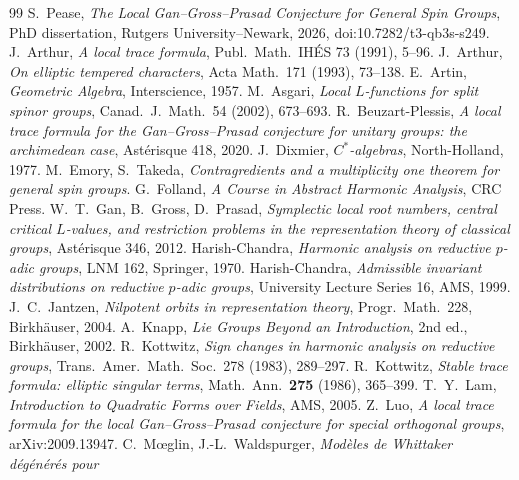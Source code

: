









\begin{thebibliography}{99}
 S.~Pease, \emph{The Local Gan--Gross--Prasad Conjecture for General Spin Groups},
  PhD dissertation, Rutgers University--Newark, 2026, doi:10.7282/t3-qb3s-s249.
 J.~Arthur, \emph{A local trace formula}, Publ.\ Math.\ IH\'ES 73 (1991), 5--96.
 J.~Arthur, \emph{On elliptic tempered characters}, Acta Math.\ 171 (1993), 73--138.
 E.~Artin, \emph{Geometric Algebra}, Interscience, 1957.
 M.~Asgari, \emph{Local $L$-functions for split spinor groups}, Canad.\ J.\ Math.\ 54 (2002),
673--693.
 R.~Beuzart-Plessis, \emph{A local trace formula for the Gan--Gross--Prasad conjecture for
  unitary groups: the archimedean case}, Ast\'erisque 418, 2020.
 J.~Dixmier, \emph{$C^*$-algebras}, North-Holland, 1977.
 M.~Emory, S.~Takeda, \emph{Contragredients and a multiplicity one theorem for general
  spin groups}.
 G.~Folland, \emph{A Course in Abstract Harmonic Analysis}, CRC Press.
 W.~T.~Gan, B.~Gross, D.~Prasad, \emph{Symplectic local root numbers, central critical
  $L$-values, and restriction problems in the representation theory of classical groups},
  Ast\'erisque 346, 2012.
 Harish-Chandra, \emph{Harmonic analysis on reductive $p$-adic groups}, LNM 162,
  Springer, 1970.
 Harish-Chandra, \emph{Admissible invariant distributions on reductive $p$-adic groups},
  University Lecture Series 16, AMS, 1999.
 J.~C.~Jantzen, \emph{Nilpotent orbits in representation theory}, Progr.\ Math.\ 228,
  Birkh\"auser, 2004.
 A.~Knapp, \emph{Lie Groups Beyond an Introduction}, 2nd ed., Birkh\"auser, 2002.
 R.~Kottwitz, \emph{Sign changes in harmonic analysis on reductive groups},
  Trans.\ Amer.\ Math.\ Soc.\ 278 (1983), 289--297.
 R.~Kottwitz, \emph{Stable trace formula: elliptic singular terms}, Math.\ Ann.\ \textbf{275} (1986), 365--399.
 T.~Y.~Lam, \emph{Introduction to Quadratic Forms over Fields}, AMS, 2005.
 Z.~Luo, \emph{A local trace formula for the local Gan--Gross--Prasad conjecture for
  special orthogonal groups}, arXiv:2009.13947.
 C.~M\oe glin, J.-L.~Waldspurger, \emph{Mod\`eles de Whittaker d\'eg\'en\'er\'es pour
}
\end{thebibliography}
